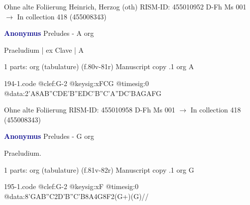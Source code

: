 \documentclass[twocolumn]{book}
\begin{document}
\newline Ohne alte Foliierung
\newline Heinrich, Herzog  (oth)
\newline RISM-ID: 455010952
\newline D-Fh  Ms 001
\newline $\rightarrow$ In collection 418 (455008343)
      
\newline \par \vspace{7pt} \textcolor{darkblue}{\textbf{Anonymus  }}
\newline Preludes - A
\newline org
\newline \begin{itshape}[f.81r, at left:] Praeludium | ex Clave | A\end{itshape} 
\newline \textcolor{darkblue}{}  1 parts: org (tabulature)  (f.80v-81r)
\newline Manuscript copy
.1  org  A  
\begin{filecontents*}{194-1.code}
@clef:G-2
@keysig:xFCG
@timesig:0
@data:2'A{8AB''CD}{E'B''ED}{C'B''C'A}{''DC'BA}{GAFG}
\end{filecontents*}
\newline
%

\newline Ohne alte Foliierung
\newline RISM-ID: 455010958
\newline D-Fh  Ms 001
\newline $\rightarrow$ In collection 418 (455008343)
      
\newline \par \vspace{7pt} \textcolor{darkblue}{\textbf{Anonymus  }}
\newline Preludes - G
\newline org
\newline \begin{itshape}[f.81v, at left:] Praeludium.\end{itshape} 
\newline \textcolor{darkblue}{}  1 parts: org (tabulature)  (f.81v-82r)
\newline Manuscript copy
.1  org  G  
\begin{filecontents*}{195-1.code}
@clef:G-2
@keysig:xF
@timesig:0
@data:{8'GAB''C}2D'B''C'B8A4G8F2(G+)(G)//
\end{filecontents*}
\newline
%
\end{document}
